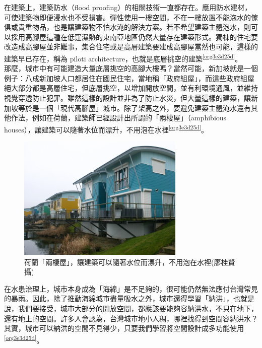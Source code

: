 \documentclass[a4paper,12pt]{article}
\begin{document}
在建築上，建築防水（flood proofing）的相關技術一直都存在。應用防水建材，可使建築物即便浸水也不受損害。彈性使用一樓空間，不在一樓放置不能泡水的傢俱或貴重物品，也是讓建築物不怕水淹的解決方案。若不希望建築主體泡水，則可以採用高腳屋這種在低窪濕熱的東南亞地區仍然大量存在建築形式。獨棟的住宅要改造成高腳屋並非難事，集合住宅或是高層建築要建成高腳屋當然也可能，這樣的建築早已存在，稱為 piloti architecture，也就是底層挑空的建築\textsuperscript{\ref{org3e3d25d}}。\\

那麼，城市中有可能建造大量底層挑空的高腳大樓嗎？當然可能，新加坡就是一個例子：八成新加坡人口都居住在國民住宅，當地稱「政府組屋」，而這些政府組屋絕大部分都是高層住宅，但底層挑空，以增加開放空間，並有利環境通風，並維持視覺穿透防止犯罪。雖然這樣的設計並非為了防止水災，但大量這樣的建築，讓新加坡等於是一個「現代高腳屋」城市。除了架高之外，要避免建築主體淹水還有其他作法，例如在荷蘭，建築師已經設計出所謂的「兩棲屋」（amphibious houses），讓建築可以隨著水位而漂升，不用泡在水裡\textsuperscript{\ref{org3e3d25d}}。\\

\begin{figure}[htbp]
\centering
\includegraphics[width=300]{images/161236830092580_P3592755.png}
\caption{\label{fig:FigName}荷蘭「兩棲屋」，讓建築可以隨著水位而漂升，不用泡在水裡(廖桂賢攝)}
\end{figure}

在水患治理上，城市本身成為「海綿」是不足夠的，很可能仍然無法應付台灣常見的暴雨。因此，除了推動海綿城市盡量吸水之外，城市還得學習「納洪」，也就是說，我們要接受，城市大部分的開放空間，都應該要能夠容納洪水，不只在地下，還有地上的空間。許多人會認為，台灣城市地小人稠，哪裡找得到空間容納洪水？其實，城市可以納洪的空間不見得少，只要我們學習將空間設計成多功能使用\textsuperscript{\ref{org3e3d25d}}。\\
\end{document}
